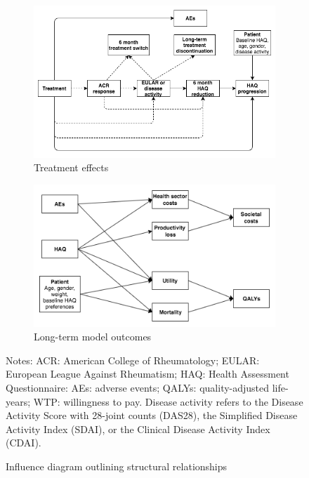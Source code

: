 \documentclass[11pt,final,fleqn]{article}
\theoremstyle{plain}
\begin{document}
\begin{figure}
\centering
\begin{subfigure}{\textwidth}
\centering
\includegraphics[width=\textwidth]{influence-diagram-a.png}
\caption{Treatment effects} \label{subfig:treatment-effects}
\end{subfigure}
\begin{subfigure}{\textwidth}
\centering
\includegraphics[width=.8\textwidth]{influence-diagram-b.png}
\caption{Long-term model outcomes} \label{subfig:model-outcomes}
\end{subfigure}
\caption{Influence diagram outlining structural relationships}\label{fig:influence-diagram}
\begin{minipage}{\linewidth}
\footnotesize
Notes: ACR: American College of Rheumatology; EULAR: European League Against Rheumatism; HAQ: Health Assessment Questionnaire: AEs: adverse events; QALYs: quality-adjusted life-years; WTP: willingness to pay. Disease activity refers to the Disease Activity Score with 28-joint counts (DAS28), the Simplified Disease Activity Index (SDAI), or the Clinical Disease Activity Index (CDAI).
\end{minipage}
\end{figure}
\end{document}
